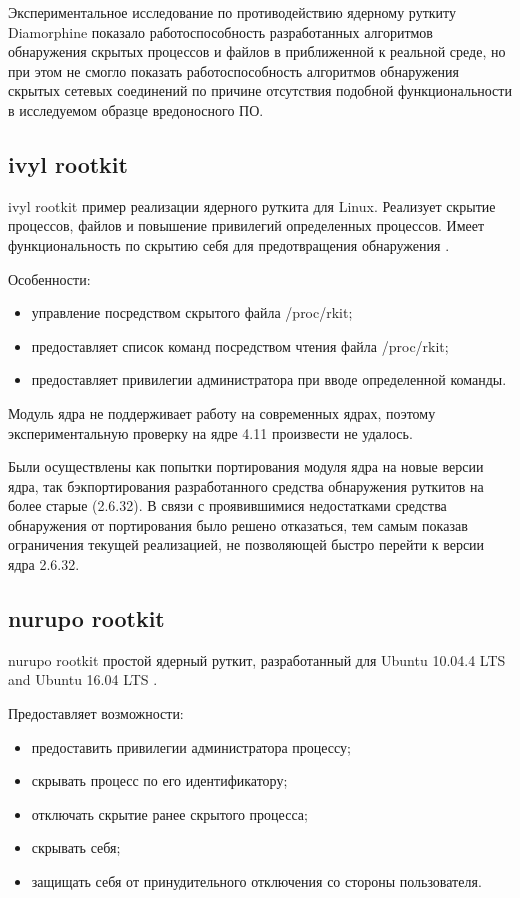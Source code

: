 \documentclass{gost7.32-2001}
\begin{document}
Экспериментальное исследование по противодействию ядерному руткиту
Diamorphine показало работоспособность разработанных алгоритмов
обнаружения скрытых процессов и файлов в приближенной к реальной
среде, но при этом не смогло показать работоспособность алгоритмов
обнаружения скрытых сетевых соединений по причине отсутствия
подобной функциональности в исследуемом образце вредоносного ПО.

\subsection{ivyl rootkit}

ivyl rootkit \dash пример реализации ядерного руткита для
Linux. Реализует скрытие процессов, файлов и повышение привилегий
определенных процессов. Имеет функциональность по скрытию себя для
предотвращения обнаружения .

Особенности:
\begin{itemize}
\item
  управление посредством скрытого файла /proc/rkit;
\item
  предоставляет список команд посредством чтения файла /proc/rkit;
\item
  предоставляет привилегии администратора при вводе определенной
  команды.
\end{itemize}

Модуль ядра не поддерживает работу на современных ядрах, поэтому
экспериментальную проверку на ядре 4.11 произвести не
удалось.

Были осуществлены как попытки портирования модуля ядра на новые версии
ядра, так бэкпортирования разработанного средства обнаружения руткитов
на более старые (2.6.32). В связи с проявившимися недостатками
средства обнаружения от портирования было решено отказаться, тем самым
показав ограничения текущей реализацией, не позволяющей быстро перейти
к версии ядра 2.6.32.

\newpage
\subsection{nurupo rootkit}

nurupo rootkit \dash простой ядерный руткит, разработанный для Ubuntu
10.04.4 LTS and Ubuntu 16.04 LTS .

Предоставляет возможности:
\begin{itemize}
\item
  предоставить привилегии администратора процессу;
\item
  скрывать процесс по его идентификатору;
\item
  отключать скрытие ранее скрытого процесса;
\item
  скрывать себя;
\item
  защищать себя от принудительного отключения со стороны пользователя.
\end{itemize}
\end{document}
